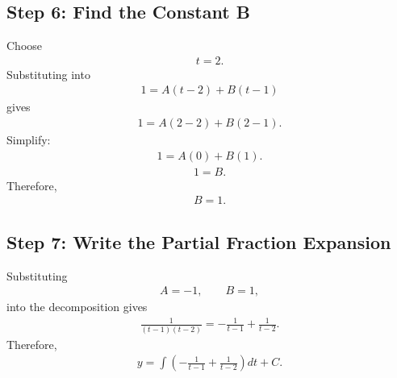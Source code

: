 \documentclass[letterpaper,10pt,english]{sphinxmanual}
\begin{document}
\subsection{Step 6: Find the Constant B}
\label{\detokenize{Language/Science_language/ODE_calculus/course_MATH_3035/homework_assignments/index_pdf:step-6-find-the-constant-b}}
\sphinxAtStartPar
Choose
\begin{equation*}
\begin{split}t=2.\end{split}
\end{equation*}
\sphinxAtStartPar
Substituting into
\begin{equation*}
\begin{split}1=A(t-2)+B(t-1)\end{split}
\end{equation*}
\sphinxAtStartPar
gives
\begin{equation*}
\begin{split}1=A(2-2)+B(2-1).\end{split}
\end{equation*}
\sphinxAtStartPar
Simplify:
\begin{equation*}
\begin{split}1=A(0)+B(1).\end{split}
\end{equation*}\begin{equation*}
\begin{split}1=B.\end{split}
\end{equation*}
\sphinxAtStartPar
Therefore,
\begin{equation*}
\begin{split}B=1.\end{split}
\end{equation*}

\subsection{Step 7: Write the Partial Fraction Expansion}
\label{\detokenize{Language/Science_language/ODE_calculus/course_MATH_3035/homework_assignments/index_pdf:step-7-write-the-partial-fraction-expansion}}
\sphinxAtStartPar
Substituting
\begin{equation*}
\begin{split}A=-1,
\qquad
B=1,\end{split}
\end{equation*}
\sphinxAtStartPar
into the decomposition gives
\begin{equation*}
\begin{split}\frac{1}{(t-1)(t-2)}
=
-\frac{1}{t-1}
+
\frac{1}{t-2}.\end{split}
\end{equation*}
\sphinxAtStartPar
Therefore,
\begin{equation*}
\begin{split}y
=
\int
\left(
-\frac{1}{t-1}
+
\frac{1}{t-2}
\right)
dt
+C.\end{split}
\end{equation*}
\end{document}
